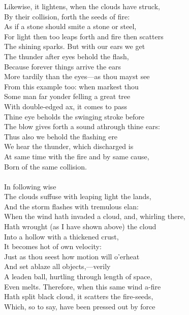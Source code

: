 Likewise, it lightens, when the clouds have struck,\\
By their collision, forth the seeds of fire:\\
As if a stone should smite a stone or steel,\\
For light then too leaps forth and fire then scatters\\
The shining sparks. But with our ears we get\\
The thunder after eyes behold the flash,\\
Because forever things arrive the ears\\
More tardily than the eyes—as thou mayst see\\
From this example too: when markest thou\\
Some man far yonder felling a great tree\\
With double-edged ax, it comes to pass\\
Thine eye beholds the swinging stroke before\\
The blow gives forth a sound athrough thine ears:\\
Thus also we behold the flashing ere\\
We hear the thunder, which discharged is\\
At same time with the fire and by same cause,\\
Born of the same collision.\\
\\
In following wise\\
The clouds suffuse with leaping light the lands,\\
And the storm flashes with tremulous elan:\\
When the wind hath invaded a cloud, and, whirling there,\\
Hath wrought (as I have shown above) the cloud\\
Into a hollow with a thickened crust,\\
It becomes hot of own velocity:\\
Just as thou seest how motion will o'erheat\\
And set ablaze all objects,—verily\\
A leaden ball, hurtling through length of space,\\
Even melts. Therefore, when this same wind a-fire\\
Hath split black cloud, it scatters the fire-seeds,\\
Which, so to say, have been pressed out by force\\
